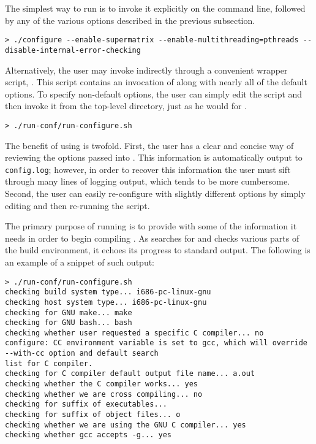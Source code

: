 The simplest way to run \configure is to invoke it explicitly on the
command line, followed by any of the various options described in the
previous subsection.

\begin{Verbatim}[frame=single,framesep=2.5mm,xleftmargin=5mm,commandchars=\\\{\},fontsize=\footnotesize]
> ./configure --enable-supermatrix --enable-multithreading=pthreads --disable-internal-error-checking
\end{Verbatim}

\noindent
Alternatively, the user may invoke \configure indirectly through a convenient
wrapper script, \runconfigurens.
This script contains an invocation of \configure along with nearly all of
the default \configure options.
To specify non-default options, the user can simply edit the script and
then invoke it from the top-level directory, just as he would for
\configurens.

\begin{Verbatim}[frame=single,framesep=2.5mm,xleftmargin=5mm,commandchars=\\\{\},fontsize=\footnotesize]
> ./run-conf/run-configure.sh
\end{Verbatim}

\noindent
The benefit of using \runconfigure is twofold.
First, the user has a clear and concise way of reviewing the options passed
into \configurens.
This information is automatically output to {\tt config.log}; however, in
order to recover this information the user must sift through many lines of
logging output, which tends to be more cumbersome.
Second, the user can easily re-configure \libflame with slightly different
options by simply editing \runconfigure and then re-running the script.


The primary purpose of running \configure is to provide \make with some of
the information it needs in order to begin compiling \libflamens.
As \configure searches for and checks various parts of the build environment,
it echoes its progress to standard output.
The following is an example of a snippet of such output:

\begin{Verbatim}[frame=single,framesep=2.5mm,xleftmargin=5mm,commandchars=\\\{\},fontsize=\footnotesize]
> ./run-conf/run-configure.sh 
checking build system type... i686-pc-linux-gnu
checking host system type... i686-pc-linux-gnu
checking for GNU make... make
checking for GNU bash... bash
checking whether user requested a specific C compiler... no
configure: CC environment variable is set to gcc, which will override --with-cc option and default search
list for C compiler.
checking for C compiler default output file name... a.out
checking whether the C compiler works... yes
checking whether we are cross compiling... no
checking for suffix of executables... 
checking for suffix of object files... o
checking whether we are using the GNU C compiler... yes
checking whether gcc accepts -g... yes
\end{Verbatim}

